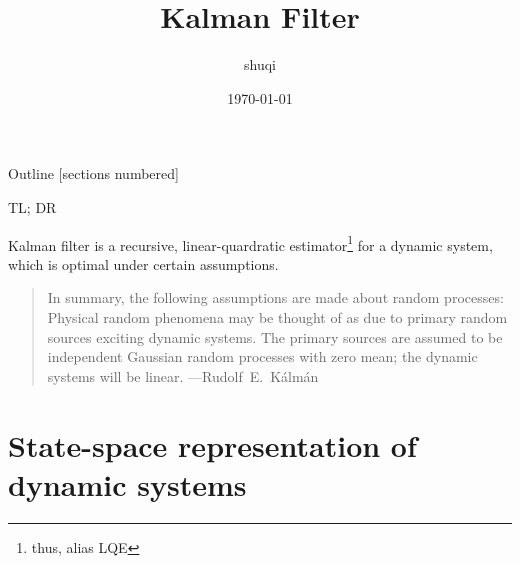 \documentclass[utf-8, 10pt, aspectratio=169]{beamer}
\title{Kalman Filter}
\author{shuqi}
\date{\today}
\institute{
    \faGithub\;\href{https://github.com/xiaosq2000}{xiaosq2000}
    \quad
    \faEnvelope\;\href{xiaosq2000@gmail.com}{xiaosq2000@gmail.com}
}
\begin{document}
\begin{frame}
	\titlepage
\end{frame}

\begin{frame}{Outline}
	[sections numbered]
	\tableofcontents[hideallsubsections]
\end{frame}

\begin{frame}{TL; DR}
	\par Kalman filter is a recursive, linear-quardratic estimator\footnote{thus, alias \alert{LQE}} for a dynamic system, which is optimal under certain assumptions.
	\vspace*{\fill}

	\begin{quote}
		In summary, the following assumptions are made about random processes: Physical random phenomena may be thought of as due to primary random sources exciting dynamic systems. The primary sources are assumed to be independent Gaussian random processes with zero mean; the dynamic systems will be linear.\supercite{kalman_new_1960}
		\flushright ---\;\textrm{Rudolf\ E.\ Kálmán}
	\end{quote}
\end{frame}

\section{State-space representation of dynamic systems}
\end{document}
